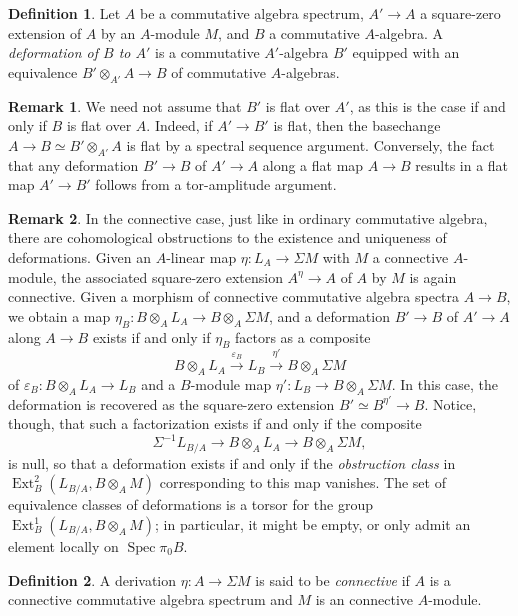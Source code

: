 \documentclass[12pt]{article}
\theoremstyle{definition}
\newtheorem{definition}{Definition}[subsection]
\newtheorem{remark}{Remark}[subsection]
\newcommand{\too}{\longrightarrow}
\DeclareMathOperator{\Ext}{Ext}
\DeclareMathOperator{\Spec}{Spec}
\renewcommand{\epsilon}{\varepsilon}
\begin{document}
\begin{definition}
Let $A$ be a commutative algebra spectrum, $A'\to A$
a square-zero extension of $A$ by an $A$-module $M$, and $B$ a commutative $A$-algebra.
A {\em deformation of $B$ to $A' $}
is a commutative $A'$-algebra $B'$ equipped with an equivalence
$B'\otimes_{A'} A\to B$ of commutative $A$-algebras.
\end{definition}
\begin{remark}
We need not assume that $B'$ is flat over $A'$, as this is the case if and only if $B$ is flat over $A$.
Indeed, if $A'\to B'$ is flat, then the basechange $A\to B\simeq B'\otimes_{A'} A$ is flat by a spectral sequence argument.
Conversely, the fact that any deformation $B'\to B$ of $A'\to A$ along a flat map $A\to B$ results in a flat map $A'\to B'$ follows from a tor-amplitude argument.
\end{remark}
\begin{remark}
In the connective case, just like in ordinary commutative algebra, there are cohomological obstructions to the existence and uniqueness of deformations.
Given an $A$-linear map $\eta:L_A\to\Sigma M$ with $M$ a connective $A$-module, the associated square-zero extension $A^\eta\to A$ of $A$ by $M$ is again connective.
Given a morphism of connective commutative algebra spectra $A\to B$, we obtain a map $\eta_B:B\otimes_A L_A\to B\otimes_A\Sigma M$, and a deformation $B'\to B$ of $A'\to A$ along $A\to B$ exists if and only if $\eta_B$ factors as a composite
\[
B\otimes_A L_A\overset{\epsilon_B}{\too} L_B\overset{\eta'}{\too} B\otimes_A\Sigma M
\]
of $\epsilon_B:B\otimes_A L_A\to L_B$ and a $B$-module map $\eta':L_B\to B\otimes_A\Sigma M$.
In this case, the deformation is recovered as the square-zero extension $B'\simeq B^{\eta'}\to B$.
Notice, though, that such a factorization exists if and only if the composite
\[
\Sigma^{-1}L_{B/A}\too B\otimes_A L_A\too B\otimes_A\Sigma M,
\]
is null, so that a deformation exists if and only if the {\em obstruction class} in $\Ext^2_B(L_{B/A}, B\otimes_A M)$ corresponding to this map vanishes.
The set of equivalence classes of deformations is a torsor for the group $\Ext^1_B(L_{B/A}, B\otimes_A M)$; in particular, it might be empty, or only admit an element locally on $\Spec\pi_0 B$.
\end{remark}
\begin{definition}
A derivation $\eta:A\to\Sigma M$ is said to be {\em connective} if $A$ is a connective commutative algebra spectrum and $M$ is an connective $A$-module.
\end{definition}
\end{document}
